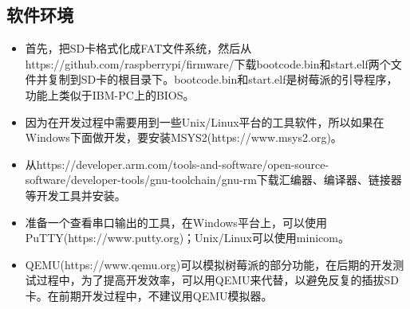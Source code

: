 \documentclass[main.tex]{subfiles}
\begin{document}
\begin{CJK*}{UTF8}{song}
\subsection{软件环境}
\begin{itemize}
\item 首先，把SD卡格式化成FAT文件系统，然后从https://github.com/raspberrypi/firmware/下载bootcode.bin和start.elf两个文件并复制到SD卡的根目录下。bootcode.bin和start.elf是树莓派的引导程序，功能上类似于IBM-PC上的BIOS。
\item 因为在开发过程中需要用到一些Unix/Linux平台的工具软件，所以如果在Windows下面做开发，要安装MSYS2(https://www.msys2.org)。
\item 从https://developer.arm.com/tools-and-software/open-source-software/developer-tools/gnu-toolchain/gnu-rm下载汇编器、编译器、链接器等开发工具并安装。
\item 准备一个查看串口输出的工具，在Windows平台上，可以使用PuTTY(https://www.putty.org)；Unix/Linux可以使用minicom。
\item QEMU(https://www.qemu.org)可以模拟树莓派的部分功能，在后期的开发测试过程中，为了提高开发效率，可以用QEMU来代替，以避免反复的插拔SD卡。在前期开发过程中，不建议用QEMU模拟器。
\end{itemize}

\clearpage
\ifxetex\else
\end{CJK*}
\fi
\end{document}
